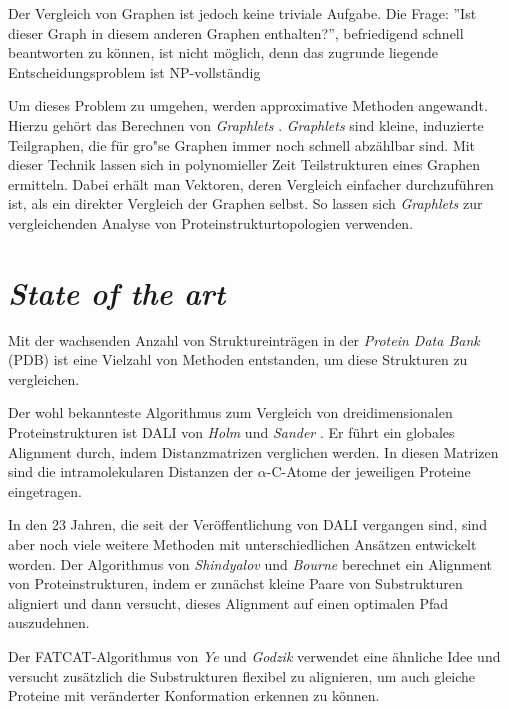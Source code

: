 \documentclass{report}
\begin{document}
Der Vergleich von Graphen ist jedoch keine triviale Aufgabe. Die Frage: ''Ist dieser Graph in diesem anderen Graphen enthalten?'', befriedigend schnell beantworten zu k\"onnen, ist nicht m\"oglich, denn das zugrunde liegende Entscheidungsproblem ist NP-vollst\"andig \cite{karp1972reducibility}

Um dieses Problem zu umgehen, werden approximative Methoden angewandt. Hierzu geh\"ort das Berechnen von \textit{Graphlets} \cite{frqdistribution}. \textit{Graphlets} sind kleine, induzierte Teilgraphen, die f\"ur gro"se Graphen immer noch schnell abz\"ahlbar sind. Mit dieser Technik lassen sich in polynomieller Zeit Teilstrukturen eines Graphen ermitteln. Dabei erh\"alt man Vektoren, deren Vergleich einfacher durchzuf\"uhren ist, als ein direkter Vergleich der Graphen selbst. So lassen sich \textit{Graphlets} zur vergleichenden Analyse von Proteinstrukturtopologien verwenden.




\section{\textit{State of the art}}

Mit der wachsenden Anzahl von Struktureintr\"agen in der \textit{Protein Data Bank} (PDB) ist eine Vielzahl von Methoden entstanden, um diese Strukturen zu vergleichen.

Der wohl bekannteste Algorithmus zum Vergleich von dreidimensionalen Proteinstrukturen ist DALI von \textit{Holm} und \textit{Sander} \cite{holm1993protein}. Er f\"uhrt ein globales Alignment durch, indem Distanzmatrizen verglichen werden. In diesen Matrizen sind die intramolekularen Distanzen der $\alpha$-C-Atome der jeweiligen Proteine eingetragen.

In den 23 Jahren, die seit der Ver\"offentlichung von DALI vergangen sind, sind aber noch viele weitere Methoden mit unterschiedlichen Ans\"atzen entwickelt worden. Der Algorithmus von \textit{Shindyalov} und \textit{Bourne} \cite{shindyalov1998protein} berechnet ein Alignment von Proteinstrukturen, indem er zun\"achst kleine Paare von Substrukturen aligniert und dann versucht, dieses Alignment auf einen optimalen Pfad auszudehnen.

Der FATCAT-Algorithmus von \textit{Ye} und \textit{Godzik} \cite{fatcat} verwendet eine \"ahnliche Idee und versucht zus\"atzlich die Substrukturen flexibel zu alignieren, um auch gleiche Proteine mit ver\"anderter Konformation erkennen zu k\"onnen.
\end{document}
